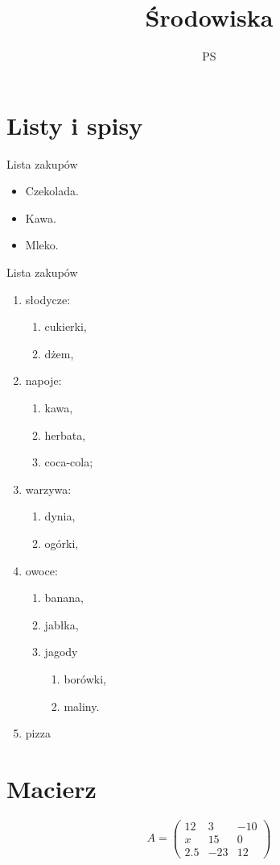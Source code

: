 \documentclass[a4paper, 12pt]{amsart}
\author{PS}
\title{\'Srodowiska}
\begin{document}
\maketitle \tableofcontents
\section{Listy i spisy}
Lista zakupów
\begin{itemize}[label=$\heartsuit$]
\item Czekolada.
\item Kawa.
\item Mleko.
\end{itemize}
Lista zakupów
\begin{enumerate}[label=(\Alph*)]
\item słodycze:
\begin{enumerate}[label=(\alph*)]
\item cukierki,
\item d\.zem,
\end{enumerate}
\item napoje:
\begin{enumerate}[label=(\arabic*)]
\item kawa,
\item herbata,
\item coca-cola;
\end{enumerate}
\item warzywa:
\begin{enumerate}[label=\Alph*)]
\item dynia,
\item ogórki,
\end{enumerate}
\item owoce:
\begin{enumerate}[label=\alph*.]
\item banana,
\item jabłka,
\item jagody
\begin{enumerate}[label=\Roman*]
\item borówki,
\item maliny.
\end{enumerate}
\end{enumerate}
\item pizza
\end{enumerate}
\section{Macierz}
$$A= \left(\begin{array}{ccc}
12&3&-10\\
x&15&0\\
2.5&-23&12
\end{array}\right)$$
\end{document}

